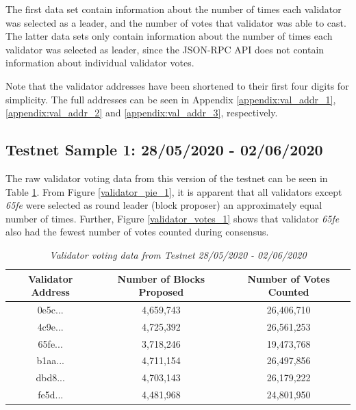 \documentclass[12pt,openany,a4paper]{book}
\begin{document}
The first data set contain information about the number of times each validator 
was selected as a leader, and the number of votes that validator was able to cast.
The latter data sets only contain information about the number of times each validator was 
selected as leader, since the JSON-RPC API does not contain information about 
individual validator votes.

Note that the validator addresses have been shortened to their first four digits
for simplicity. The full addresses can be seen in Appendix \ref{appendix:val_addr_1}, 
\ref{appendix:val_addr_2} and \ref{appendix:val_addr_3}, respectively.

\subsection{Testnet Sample 1: 28/05/2020 - 02/06/2020}
The raw validator voting data from this version of the testnet can be seen in Table 
\ref{validator_table_1}. From Figure \ref{validator_pie_1}, it is apparent that all 
validators except \textit{65fe} were selected as round leader (block proposer) an 
approximately equal number of times. Further, Figure \ref{validator_votes_1} shows that
validator \textit{65fe} also had the fewest number of votes counted during consensus.

\begin{table}[h!]
    \caption{\sl Validator voting data from Testnet 28/05/2020 - 02/06/2020}
    \label{validator_table_1}
\begin{center}
\begin{tabular}{ |c|c|c| } 
    \hline
    Validator Address & Number of Blocks Proposed & Number of Votes Counted \\
    \hline
    \hline
    0e5c... & 4,659,743 & 26,406,710 \\
    \hline
    4c9e... & 4,725,392 & 26,561,253 \\
    \hline
    65fe... & 3,718,246 & 19,473,768 \\
    \hline
    b1aa... & 4,711,154 & 26,497,856 \\
    \hline
    dbd8... & 4,703,143 & 26,179,222 \\
    \hline
    fe5d... & 4,481,968 & 24,801,950 \\
    \hline
\end{tabular}
\end{center}
\end{table}
\end{document}
